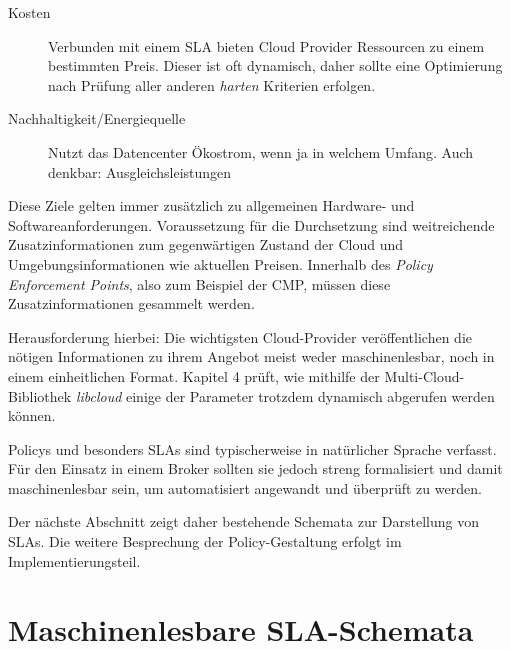 \begin{description}
	\item[Kosten] Verbunden mit einem SLA bieten Cloud Provider Ressourcen zu einem bestimmten Preis. Dieser ist oft dynamisch, daher sollte eine Optimierung nach Prüfung aller anderen \emph{harten} Kriterien erfolgen.
	 	
	\item[Nachhaltigkeit/Energiequelle] Nutzt das Datencenter Ökostrom, wenn ja in welchem Umfang. Auch denkbar: Ausgleichsleistungen
	
	
\end{description}

\noindent 
Diese Ziele gelten immer zusätzlich zu allgemeinen Hardware- und Softwareanforderungen. Voraussetzung für die Durchsetzung sind weitreichende Zusatzinformationen zum gegenwärtigen Zustand der Cloud und Umgebungsinformationen wie aktuellen Preisen. Innerhalb des \emph{Policy Enforcement Points}, also zum Beispiel der CMP, müssen diese Zusatzinformationen gesammelt werden.

Herausforderung hierbei: Die wichtigsten Cloud-Provider veröffentlichen die nötigen Informationen zu ihrem Angebot meist weder maschinenlesbar, noch in einem einheitlichen Format. Kapitel 4 prüft, wie mithilfe der Multi-Cloud-Bibliothek \emph{libcloud} einige der Parameter trotzdem dynamisch abgerufen werden können.

Policys und besonders SLAs sind typischerweise in natürlicher Sprache verfasst. Für den Einsatz in einem Broker sollten sie jedoch streng formalisiert und damit maschinenlesbar sein, um automatisiert angewandt und überprüft zu werden.

Der nächste Abschnitt zeigt daher bestehende Schemata zur Darstellung von SLAs.
Die weitere Besprechung der Policy-Gestaltung erfolgt im Implementierungsteil. 

\section{Maschinenlesbare SLA-Schemata}


